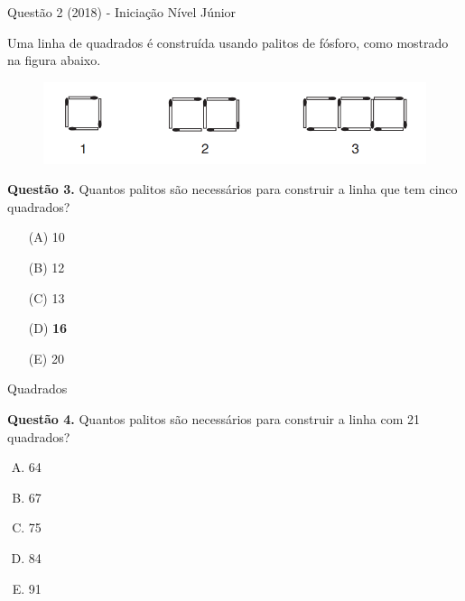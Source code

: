 \documentclass{beamer}
\begin{document}

\begin{frame}{Questão 2 (2018) - Iniciação Nível Júnior}

Uma linha de quadrados é construída usando palitos de fósforo, como mostrado na figura abaixo.

\begin{figure}[ht]
\centering
\includegraphics[width=.9\textwidth]{fosforos.png}
\label{fig:exampleFig2}
\end{figure}

\textbf{Questão 3.} Quantos palitos são necessários para construir a linha que tem cinco quadrados?

\begin{enumerate}
 \item[(A)] 10
 \item[(B)] 12
 \item[(C)] 13
 \item[(D)] \textbf{16}
 \item[(E)] 20
\end{enumerate}
\end{frame}
\begin{frame}{Quadrados}

\textbf{Questão 4.} Quantos palitos são necessários
para construir a linha com 21 quadrados?
\begin{enumerate}[(A)]
    \item 64
    \item 67
    \item 75
    \item 84
    \item 91
\end{enumerate}

\end{frame}

\end{document}
